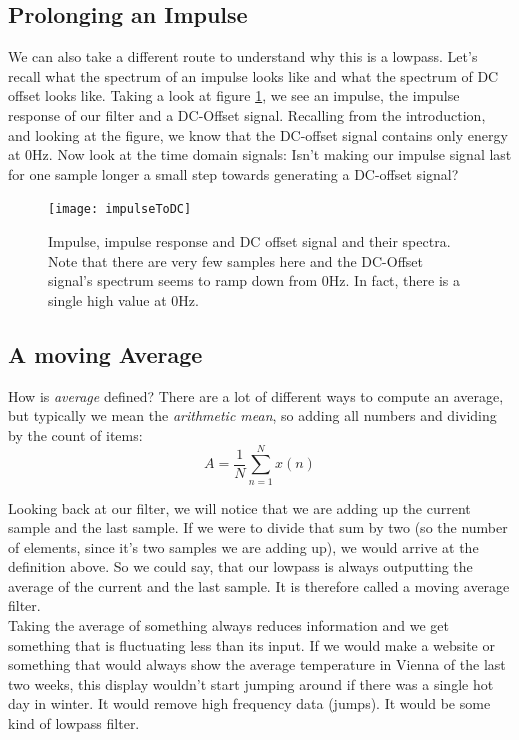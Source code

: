 

\subsection{Prolonging an Impulse}
We can also take a different route to understand why this is a lowpass. Let's recall what the spectrum of an impulse looks like and what the spectrum of DC offset looks like. Taking a look at figure \ref{fig:impToDc}, we see an impulse, the impulse response of our filter and a DC-Offset signal. Recalling from the introduction, and looking at the figure, we know that the DC-offset signal contains only energy at 0Hz. Now look at the time domain signals: Isn't making our impulse signal last for one sample longer a small step towards generating a DC-offset signal?

\begin{figure}[H]
	\centering
	\texttt{[image: impulseToDC]}
	\caption[Spectrum Impulse, Lowpass, DC]
	{Impulse, impulse response and DC offset signal and their spectra. Note that there are very few samples here and the DC-Offset signal's spectrum seems to ramp down from 0Hz. In fact, there is a single high value at 0Hz.}
	\label{fig:impToDc}
\end{figure}

\subsection{A moving Average}
How is \textit{average} defined? There are a lot of different ways to compute an average, but typically we mean the \textit{arithmetic mean}, so adding all numbers and dividing by the count of items:
\begin{equation}
	A = \frac{1}{N} \sum_{n=1}^N x(n)
\end{equation}

Looking back at our filter, we will notice that we are adding up the current sample and the last sample. If we were to divide that sum by two (so the number of elements, since it's two samples we are adding up), we would arrive at the definition above. So we could say, that our lowpass is always outputting the average of the current and the last sample. It is therefore called a moving average filter. \\
Taking the average of something always reduces information and we get something that is fluctuating less than its input. If we would make a website or something that would always show the average temperature in Vienna of the last two weeks, this display wouldn't start jumping around if there was a single hot day in winter. It would remove high frequency data (jumps). It would be some kind of lowpass filter.


